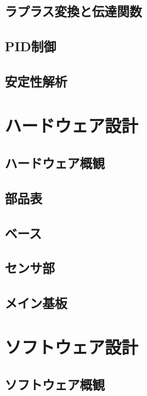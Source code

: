 \documentclass{ltjsreport}
\begin{document}
\section{ラプラス変換と伝達関数}

\section{PID制御}

\section{安定性解析}



\chapter{ハードウェア設計}
\section{ハードウェア概観}

\section{部品表}

\section{ベース}

\section{センサ部}

\section{メイン基板}







\chapter{ソフトウェア設計}
\section{ソフトウェア概観}
\end{document}
